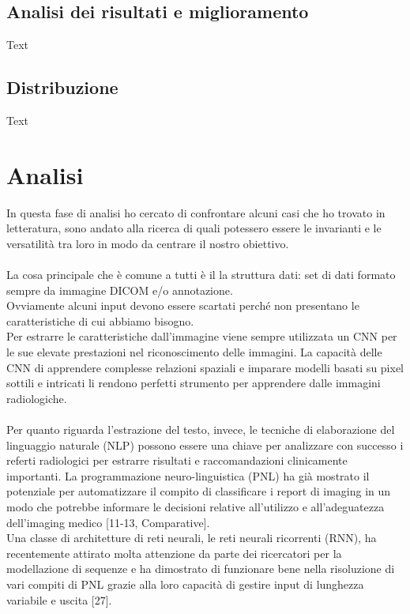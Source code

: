 \documentclass[12pt,a4paper]{report}
\begin{document}
\subsection{Analisi dei risultati e miglioramento}
Text

\subsection{Distribuzione}
Text

\section{Analisi}
In questa fase di analisi ho cercato di confrontare alcuni casi che ho trovato in letteratura, sono andato alla ricerca di quali potessero essere le invarianti e le versatilità tra loro in modo da centrare il nostro obiettivo.\\
\\
La cosa principale che è comune a tutti è il la struttura dati: set di dati formato sempre  da immagine DICOM e/o annotazione.\\
Ovviamente alcuni input devono essere scartati perché non presentano le caratteristiche di cui abbiamo bisogno.\\
Per estrarre le caratteristiche dall’immagine viene sempre utilizzata un CNN per le sue elevate prestazioni nel riconoscimento delle immagini. La capacità delle CNN di apprendere complesse relazioni spaziali e
imparare modelli basati su pixel sottili e intricati li rendono perfetti strumento per apprendere dalle immagini radiologiche. \\
\\
Per quanto riguarda l'estrazione del testo, invece, le tecniche di elaborazione del linguaggio naturale (NLP) possono essere una chiave per analizzare con successo i referti radiologici per estrarre risultati e raccomandazioni clinicamente importanti. La programmazione neuro-linguistica (PNL) ha già mostrato il potenziale per automatizzare il compito di classificare i report di imaging in un modo che potrebbe informare le decisioni relative all'utilizzo e all'adeguatezza dell'imaging medico [11-13, Comparative].\\
Una classe di architetture di reti neurali, le reti neurali ricorrenti (RNN), ha recentemente attirato molta attenzione da parte dei ricercatori per la modellazione di sequenze e ha dimostrato di funzionare bene nella risoluzione di vari compiti di PNL grazie alla loro capacità di gestire input di lunghezza variabile e uscita [27].\\
\end{document}
